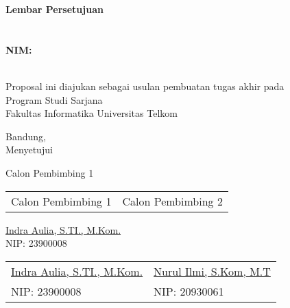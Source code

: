 {\centering
\textbf{\large Lembar Persetujuan}\\
\vspace{0.5cm}
\textbf{\Title}\\
\vspace{0.5cm}
\textbf{\textit{\EngTitle}}\\
\vspace{0.5cm}
\textbf{NIM: \NIM}\\
\textbf{\Author}\\
\vspace{1cm}


{ Proposal ini diajukan sebagai usulan pembuatan tugas akhir pada\\ Program Studi Sarjana \Prodi\\ Fakultas Informatika Universitas Telkom}\\

\vspace{0.5cm}

{Bandung, \Tanggal\quad \Bulan \quad \Date}\\
{Menyetujui}\\

\vspace{0.5cm}
      \ifPembimbingHanyaSatu
             \begin{center}
            Calon Pembimbing 1
            \end{center}
       \else
          \begin{center}
              \begin{tabular}{  m{8cm}  m{8cm} }
              Calon Pembimbing 1 & Calon Pembimbing 2
              \end{tabular}
           \end{center}
      \fi
\begin{center}
\vspace{2cm}
\ifPembimbingHanyaSatu
     \underline{Indra Aulia, S.TI., M.Kom.} \\ 
      NIP: 23900008
\else
\begin{tabular}{  m{8cm}  m{8cm} }
\underline{Indra Aulia, S.TI., M.Kom.} & \underline{Nurul Ilmi, S.Kom, M.T} \\ 
NIP: 23900008 & NIP: 20930061
\end{tabular}
\fi
\end{center}
\vspace{0.5cm}

}